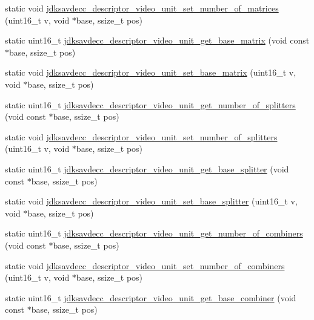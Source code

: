 \begin{DoxyCompactItemize}
\item 
static void \hyperlink{group__descriptor__video_ga7da655cb88e8cf2b3a12ead76adcb922}{jdksavdecc\+\_\+descriptor\+\_\+video\+\_\+unit\+\_\+set\+\_\+number\+\_\+of\+\_\+matrices} (uint16\+\_\+t v, void $\ast$base, ssize\+\_\+t pos)
\item 
static uint16\+\_\+t \hyperlink{group__descriptor__video_ga3aefeb88cf3745de9657a7d6bfc7a8b6}{jdksavdecc\+\_\+descriptor\+\_\+video\+\_\+unit\+\_\+get\+\_\+base\+\_\+matrix} (void const $\ast$base, ssize\+\_\+t pos)
\item 
static void \hyperlink{group__descriptor__video_ga6e6f153070bf0ded0b81097b52f00d59}{jdksavdecc\+\_\+descriptor\+\_\+video\+\_\+unit\+\_\+set\+\_\+base\+\_\+matrix} (uint16\+\_\+t v, void $\ast$base, ssize\+\_\+t pos)
\item 
static uint16\+\_\+t \hyperlink{group__descriptor__video_ga6b8a6a9ed716981097032b0d33f6b2c5}{jdksavdecc\+\_\+descriptor\+\_\+video\+\_\+unit\+\_\+get\+\_\+number\+\_\+of\+\_\+splitters} (void const $\ast$base, ssize\+\_\+t pos)
\item 
static void \hyperlink{group__descriptor__video_ga1021559f71d3e0165c7f6e0fdf01583e}{jdksavdecc\+\_\+descriptor\+\_\+video\+\_\+unit\+\_\+set\+\_\+number\+\_\+of\+\_\+splitters} (uint16\+\_\+t v, void $\ast$base, ssize\+\_\+t pos)
\item 
static uint16\+\_\+t \hyperlink{group__descriptor__video_gad9637961b151019b74fccf006cb55cb3}{jdksavdecc\+\_\+descriptor\+\_\+video\+\_\+unit\+\_\+get\+\_\+base\+\_\+splitter} (void const $\ast$base, ssize\+\_\+t pos)
\item 
static void \hyperlink{group__descriptor__video_ga7450dc8fa3493bda4f4971207e34d7d1}{jdksavdecc\+\_\+descriptor\+\_\+video\+\_\+unit\+\_\+set\+\_\+base\+\_\+splitter} (uint16\+\_\+t v, void $\ast$base, ssize\+\_\+t pos)
\item 
static uint16\+\_\+t \hyperlink{group__descriptor__video_ga38a8c4d3fdc8c2e1cd01aedf5dc0cd25}{jdksavdecc\+\_\+descriptor\+\_\+video\+\_\+unit\+\_\+get\+\_\+number\+\_\+of\+\_\+combiners} (void const $\ast$base, ssize\+\_\+t pos)
\item 
static void \hyperlink{group__descriptor__video_gad5271eb04245fbddabd1cac8d50f2743}{jdksavdecc\+\_\+descriptor\+\_\+video\+\_\+unit\+\_\+set\+\_\+number\+\_\+of\+\_\+combiners} (uint16\+\_\+t v, void $\ast$base, ssize\+\_\+t pos)
\item 
static uint16\+\_\+t \hyperlink{group__descriptor__video_ga36b6feea8a4a307da0c5b4706597de06}{jdksavdecc\+\_\+descriptor\+\_\+video\+\_\+unit\+\_\+get\+\_\+base\+\_\+combiner} (void const $\ast$base, ssize\+\_\+t pos)

\end{DoxyCompactItemize}
